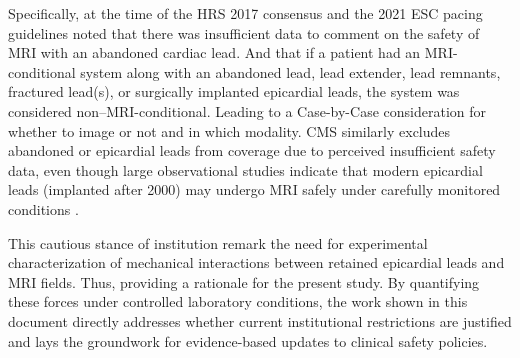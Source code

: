 Specifically, at the time of the HRS 2017 consensus and the 2021 ESC pacing guidelines noted that there was insufficient data to comment on the safety of MRI with an abandoned cardiac lead. And that if a patient had an MRI-conditional system along with an abandoned lead, lead extender, lead remnants, fractured lead(s), or surgically implanted epicardial leads, the system was considered non–MRI-conditional. Leading to a Case-by-Case consideration for whether to image or not and in which modality. CMS similarly excludes abandoned or epicardial leads from coverage due to perceived insufficient safety data, even though large observational studies indicate that modern epicardial leads (implanted after 2000) may undergo MRI safely under carefully monitored conditions \cite{vuorinen2021,schaller2021}.

This cautious stance of institution remark the need for experimental characterization of mechanical interactions between retained epicardial leads and MRI fields. Thus, providing a rationale for the present study. By quantifying these forces under controlled laboratory conditions, the work shown in this document directly addresses whether current institutional restrictions are justified and lays the groundwork for evidence-based updates to clinical safety policies.